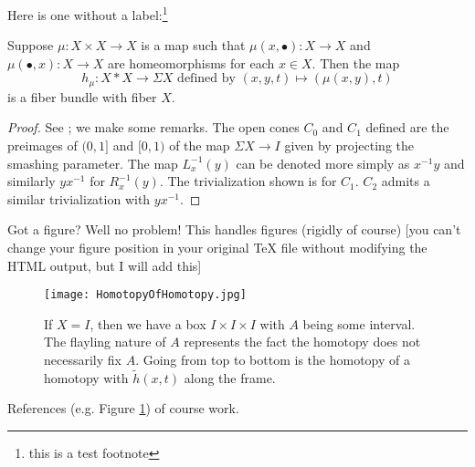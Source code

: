 \documentclass{amsart}
\begin{document}
Here is one without a label:\footnote{this is a test footnote}
\begin{proposition}
Suppose $\mu:X\times X\to X$ is a map such that $\mu(x,\bullet):X\to X$ and $\mu(\bullet,x):X\to X$ are homeomorphisms for each $x\in X$. Then the map
$$
    h_{\mu}:X*X\to \Sigma X\mbox{ defined by }(x,y,t)\mapsto (\mu(x,y),t)
$$
is a fiber bundle with fiber $X$.
\end{proposition}
\begin{proof}
    See \cite[Proposition VII.8.8]{Bredon1993}; we make some remarks. The open cones $C_0$ and $C_1$ defined are the preimages of $(0,1]$ and $[0,1)$ of the map $\Sigma X\to I$ given by projecting the smashing parameter. The map $L_x^{-1}(y)$ can be denoted more simply as $x^{-1}y$ and similarly $yx^{-1}$ for $R_x^{-1}(y)$. The trivialization shown is for $C_1$. $C_2$ admits a similar trivialization with $yx^{-1}$.
\end{proof}

Got a figure? Well no problem! This handles figures (rigidly of course) [you can't change your figure position in your original TeX file without modifying the HTML output, but I will add this]
\begin{figure}
    \centering
    \texttt{[image: HomotopyOfHomotopy.jpg]}
    \caption{If $X=I$, then we have a box $I\times I\times I$ with $A$ being some interval. The flayling nature of $A$ represents the fact the homotopy does not necessarily fix $A$. Going from top to bottom is the homotopy of a homotopy with $\tilde h(x,t)$ along the frame.}\label{fig:2}
\end{figure}

References (e.g. Figure \ref{fig:2}) of course work.
\end{document}
